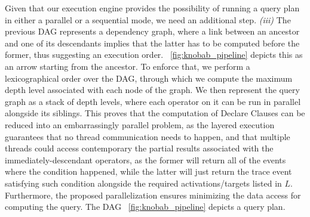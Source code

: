 Given that our execution engine provides the possibility of running a query plan in either a parallel or a sequential mode, we need   an additional step. \textit{(iii)} The previous DAG  represents a dependency graph, where a link between an ancestor and one of its descendants implies that the latter has to be computed before the former, thus suggesting an execution order. \figurename~\ref{fig:knobab_pipeline} depicts this as an arrow starting from the ancestor. To enforce that, we perform a lexicographical order over the DAG, through which we compute the maximum depth level associated with each node of the graph. %
We then represent the query graph as a stack of depth levels, where each operator on it can be run in parallel alongside its siblings.
 This proves that the computation of Declare Clauses can be reduced into an embarrassingly parallel problem, as the layered execution guarantees that no thread communication needs to happen, and that multiple threads could access contemporary the partial results associated with the immediately-descendant operators, as the former will return all of the events where the condition happened, while the latter will just return the trace event satisfying such condition alongside the required activations/targets listed in $L$. Furthermore, the proposed parallelization ensures minimizing the data access for computing the query. The DAG \figurename~\ref{fig:knobab_pipeline} depicts a query plan.
